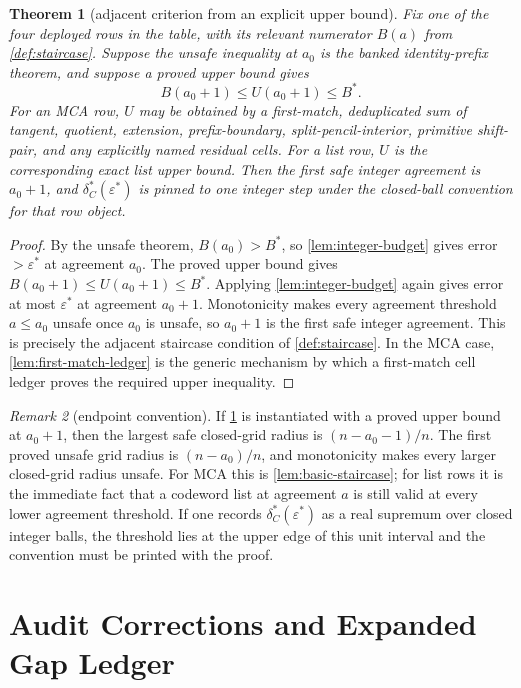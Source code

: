 \documentclass[a4paper,11pt]{amsart}
\newtheorem{theorem}{Theorem}[section]
\theoremstyle{remark}
\newtheorem{remark}[theorem]{Remark}
\begin{document}
\begin{theorem}[adjacent criterion from an explicit upper bound]\label{thm:finite}
Fix one of the four deployed rows in the table, with its relevant numerator \(B(a)\) from \cref{def:staircase}.  Suppose the unsafe inequality at \(a_0\) is the banked identity-prefix theorem, and suppose a proved upper bound gives
\[
        B(a_0+1)\le U(a_0+1)\le B^* .
\]
For an MCA row, \(U\) may be obtained by a first-match, deduplicated sum of tangent, quotient, extension, prefix-boundary, split-pencil-interior, primitive shift-pair, and any explicitly named residual cells.  For a list row, \(U\) is the corresponding exact list upper bound.  Then the first safe integer agreement is \(a_0+1\), and \(\delta_C^*(\varepsilon^*)\) is pinned to one integer step under the closed-ball convention for that row object.
\end{theorem}

\begin{proof}
By the unsafe theorem, \(B(a_0)>B^*\), so \cref{lem:integer-budget} gives error \(>\varepsilon^*\) at agreement \(a_0\).  The proved upper bound gives \(B(a_0+1)\le U(a_0+1)\le B^*\).  Applying \cref{lem:integer-budget} again gives error at most \(\varepsilon^*\) at agreement \(a_0+1\).  Monotonicity makes every agreement threshold \(a\le a_0\) unsafe once \(a_0\) is unsafe, so \(a_0+1\) is the first safe integer agreement.  This is precisely the adjacent staircase condition of \cref{def:staircase}.  In the MCA case, \cref{lem:first-match-ledger} is the generic mechanism by which a first-match cell ledger proves the required upper inequality.
\end{proof}

\begin{remark}[endpoint convention]\label{rem:endpoint}
If \cref{thm:finite} is instantiated with a proved upper bound at \(a_0+1\), then the largest safe closed-grid radius is \((n-a_0-1)/n\).  The first proved unsafe grid radius is \((n-a_0)/n\), and monotonicity makes every larger closed-grid radius unsafe.  For MCA this is \cref{lem:basic-staircase}; for list rows it is the immediate fact that a codeword list at agreement \(a\) is still valid at every lower agreement threshold.  If one records \(\delta_C^*(\varepsilon^*)\) as a real supremum over closed integer balls, the threshold lies at the upper edge of this unit interval and the convention must be printed with the proof.
\end{remark}

\section{Audit Corrections and Expanded Gap Ledger}
\end{document}
